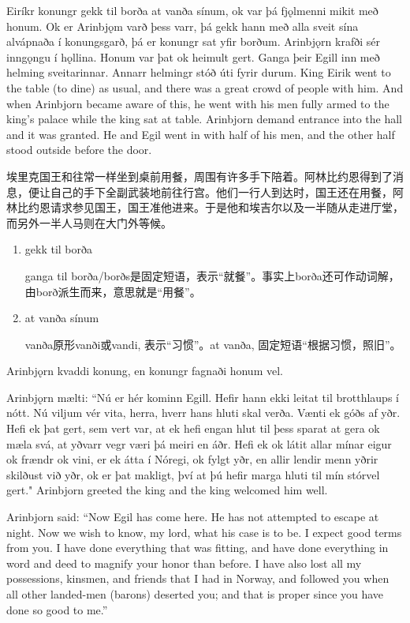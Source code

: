 \begin{paracol}{2}
    Eiríkr konungr gekk til borða at vanða sínum, ok var þá fjǫlmenni mikit með honum. Ok er Arinbjǫm varð þess varr, þá gekk hann með alla sveit sína alvápnaða í konungsgarð, þá er konungr sat yfir borðum. Arinbjǫrn krafði sér inngǫngu í hǫllina. Honum var þat ok heimult gert. Ganga þeir Egill inn með helming sveitarinnar. Annarr helmingr stóð úti fyrir durum.
    \switchcolumn
    King Eirik went to the table (to dine) as usual, and there was a great crowd of people with him. And when Arinbjorn became aware of this, he went with his men fully armed to the king's palace while the king sat at table. Arinbjorn demand entrance into the hall and it was granted. He and Egil went in with half of his men, and the other half stood outside before the door.
\end{paracol}

\begin{translation*}{}
    埃里克国王和往常一样坐到桌前用餐，周围有许多手下陪着。阿林比约恩得到了消息，便让自己的手下全副武装地前往行宫。他们一行人到达时，国王还在用餐，阿林比约恩请求参见国王，国王准他进来。于是他和埃吉尔以及一半随从走进厅堂，而另外一半人马则在大门外等候。
\end{translation*}
\begin{grammar*}{}
    \begin{enumerate}[leftmargin=*]
        \item gekk til borða

              ganga til borða/borðs是固定短语，表示“就餐”。事实上borða还可作动词解，由borð派生而来，意思就是“用餐”。
        \item at vanða sínum

              vanða原形vanði或vandi, 表示“习惯”。at vanða, 固定短语“根据习惯，照旧”。
    \end{enumerate}
\end{grammar*}
\begin{paracol}{2}
    Arinbjǫrn kvaddi konung, en konungr fagnaði honum vel.

    Arinbjǫrn mælti: ``Nú er hér kominn Egill. Hefir hann ekki leitat til brotthlaups í nótt. Nú viljum vér vita, herra, hverr hans hluti skal verða. Vænti ek góðs af yðr. Hefi ek þat gert, sem vert var, at ek hefi engan hlut til þess sparat at gera ok mæla svá, at yðvarr vegr væri þá meiri en áðr. Hefi ek ok látit allar mínar eigur ok frændr ok vini, er ek átta í Nóregi, ok fylgt yðr, en allir lendir menn yðrir skilðust við yðr, ok er þat makligt, því at þú hefir marga hluti til mín stórvel gert."
    \switchcolumn
    Arinbjorn greeted the king and the king welcomed him well.

    Arinbjorn said: ``Now Egil has come here. He has not attempted to escape at night. Now we wish to know, my lord, what his case is to be. I expect good terms from you. I have done everything that was fitting, and have done everything in word and deed to magnify your honor than before. I have also lost all my possessions, kinsmen, and friends that I had in Norway, and followed you when all other landed-men (barons) deserted you; and that is proper since you have done so good to me.''
\end{paracol}

